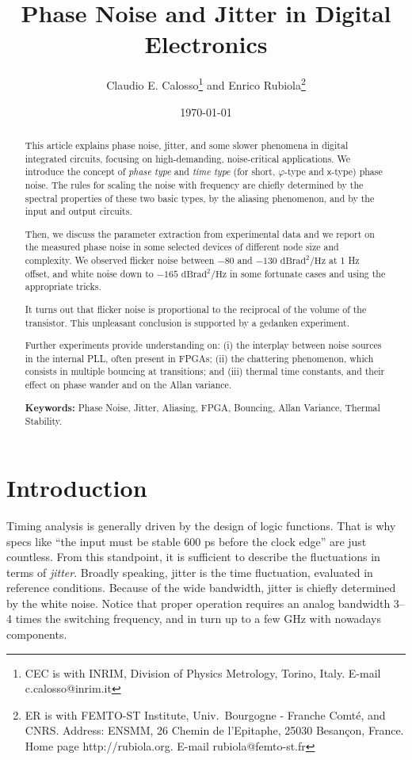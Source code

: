 \documentclass{article}
\title{Phase Noise and Jitter in Digital Electronics}
\author{Claudio E. Calosso\thanks{CEC is with INRIM, 
Division of Physics Metrology, Torino, Italy.  E-mail c.calosso@inrim.it} and Enrico Rubiola\thanks{ER is with FEMTO-ST Institute, Univ.\ Bourgogne - Franche Comt\'{e}, and CNRS.  Address: ENSMM, 26 Chemin de l'Epitaphe, 25030 Besan\c{c}on, France.  Home page http://rubiola.org.  E-mail rubiola@femto-st.fr}}
\date{\today}
\newcommand{\unit}[1]{\ensuremath{\mathrm{#1}}}
\begin{document}
\maketitle

\begin{abstract}
This article explains phase noise, jitter, and some slower phenomena in digital integrated circuits, focusing on high-demanding, noise-critical applications.
We introduce the concept of \emph{phase type} and \emph{time type} (for short, $\varphi$-type and $\mathsf{x}$-type) phase noise.  The rules for scaling the noise with frequency are chiefly determined by the spectral properties of these two basic types, by the aliasing phenomenon, and by the input and output circuits.

Then, we discuss the parameter extraction from experimental data and we report on the measured phase noise in some selected devices of different node size and complexity.  
We observed flicker noise between $-80$ and $-130$ \unit{dBrad^2/Hz} at 1 Hz offset, and white noise down to $-165$ \unit{dBrad^2/Hz} in some fortunate cases and using the appropriate tricks.

It turns out that flicker noise is proportional to the reciprocal of the volume of the transistor. This unpleasant conclusion is supported by a gedanken experiment.

Further experiments provide understanding on: (i) the interplay between noise sources in the internal PLL, often present in FPGAs;  (ii) the chattering phenomenon, which consists in multiple bouncing at transitions; and (iii) thermal time constants, and their effect on phase wander and on the Allan variance. 

\vspace{1em}\textbf{Keywords:}
Phase Noise, Jitter, Aliasing, FPGA, Bouncing, Allan Variance, Thermal Stability.

\end{abstract}


\section{Introduction}\label{sec:Introduction}
Timing analysis is generally driven by the design of logic functions.  That is why specs like ``the input must be stable 600 ps before the clock edge'' are just countless.  
From this standpoint, it is sufficient to describe the fluctuations in terms of \emph{jitter}.
Broadly speaking, jitter is the time fluctuation, evaluated in reference conditions. 
Because of the wide bandwidth, jitter is chiefly determined by the white noise.  Notice that proper operation requires an analog bandwidth 3--4 times the switching frequency, and in turn up to a few GHz with nowadays components. 
\end{document}
